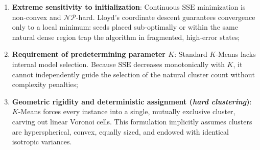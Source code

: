 \begin{enumerate}
    \item \textbf{Extreme sensitivity to initialization}: Continuous $\mathrm{SSE}$ minimization is non-convex and $\mathcal{NP}$-hard. Lloyd's coordinate descent guarantees convergence only to a local minimum: seeds placed sub-optimally or within the same natural dense region trap the algorithm in fragmented, high-error states;
    \item \textbf{Requirement of predetermining parameter $K$}: Standard $K$-Means lacks internal model selection. Because $\mathrm{SSE}$ decreases monotonically with $K$, it cannot independently guide the selection of the natural cluster count without complexity penalties;
    \item \textbf{Geometric rigidity and deterministic assignment (\textit{hard clustering})}: $K$-Means forces every instance into a single, mutually exclusive cluster, carving out linear Voronoi cells. This formulation implicitly assumes clusters are hyperspherical, convex, equally sized, and endowed with identical isotropic variances.
\end{enumerate}

